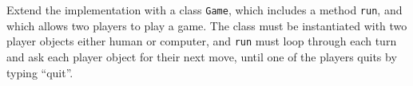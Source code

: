 Extend the implementation with a class \lstinline{Game}, which includes a method \lstinline{run}, and which allows two players to play a game. The class must be instantiated with two player objects either human or computer, and \lstinline{run} must loop through each turn and ask each player object for their next move, until one of the players quits by typing ``quit''.
